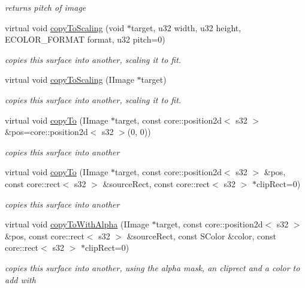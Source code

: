 \begin{DoxyCompactItemize}
\begin{DoxyCompactList}\small\item\em returns pitch of image \end{DoxyCompactList}\item 
virtual void \hyperlink{classirr_1_1video_1_1_c_image_a53eca0f6a2249b42474aa5a20d320642}{copy\-To\-Scaling} (void $\ast$target, u32 width, u32 height, E\-C\-O\-L\-O\-R\-\_\-\-F\-O\-R\-M\-A\-T format, u32 pitch=0)
\begin{DoxyCompactList}\small\item\em copies this surface into another, scaling it to fit. \end{DoxyCompactList}\item 
virtual void \hyperlink{classirr_1_1video_1_1_c_image_aaaf697105a454521d6350615ff295259}{copy\-To\-Scaling} (I\-Image $\ast$target)
\begin{DoxyCompactList}\small\item\em copies this surface into another, scaling it to fit. \end{DoxyCompactList}\item 
virtual void \hyperlink{classirr_1_1video_1_1_c_image_a200537279763ba36f8efe3ec7eaadfcd}{copy\-To} (I\-Image $\ast$target, const core\-::position2d$<$ s32 $>$ \&pos=core\-::position2d$<$ s32 $>$(0, 0))
\begin{DoxyCompactList}\small\item\em copies this surface into another \end{DoxyCompactList}\item 
virtual void \hyperlink{classirr_1_1video_1_1_c_image_ab85a973100b8bde6ba8ee85952e8aa7b}{copy\-To} (I\-Image $\ast$target, const core\-::position2d$<$ s32 $>$ \&pos, const core\-::rect$<$ s32 $>$ \&source\-Rect, const core\-::rect$<$ s32 $>$ $\ast$clip\-Rect=0)
\begin{DoxyCompactList}\small\item\em copies this surface into another \end{DoxyCompactList}\item 
virtual void \hyperlink{classirr_1_1video_1_1_c_image_a5d4d094a70f4ae57ac388534fdbff1bb}{copy\-To\-With\-Alpha} (I\-Image $\ast$target, const core\-::position2d$<$ s32 $>$ \&pos, const core\-::rect$<$ s32 $>$ \&source\-Rect, const S\-Color \&color, const core\-::rect$<$ s32 $>$ $\ast$clip\-Rect=0)
\begin{DoxyCompactList}\small\item\em copies this surface into another, using the alpha mask, an cliprect and a color to add with \end{DoxyCompactList}\item 

\end{DoxyCompactItemize}
